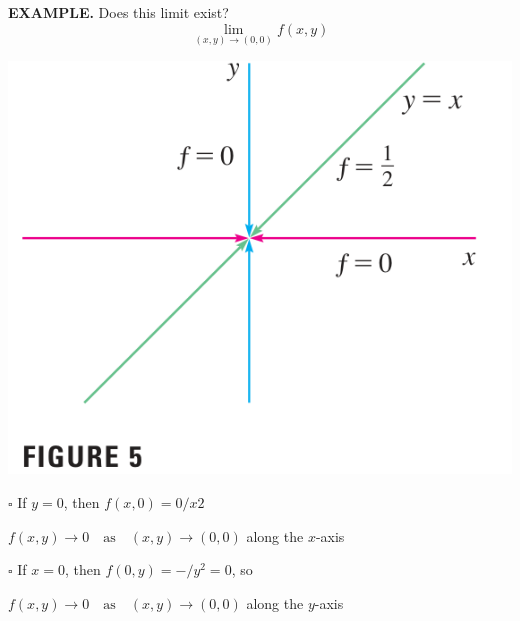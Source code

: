 \documentclass{article}
\begin{document}
  {\selectfont \textbf{\textcolor{blue5}{EXAMPLE.}}} Does this limit exist?
  \[\lim_{(x,y) \to (0,0)} f(x,y)\]

    \begin{minipage}[]{0.35\linewidth}
      \begin{center}
        \includegraphics[width = 5 cm]{./images/lim3g2.png} 
      \end{center}
    \end{minipage}
  \begin{minipage}[]{0.6\linewidth}
    $\square$ If $y = 0$, then $f(x,0) = 0/ x2 $
    \begin{center}
      $f(x,y) \to 0 \quad \text{as} \quad (x,y) \to (0,0)$ along the $x$-axis
    \end{center}
    $\square$ If $x = 0$, then $f(0,y) = -/ y^2 = 0$, so 
    \begin{center}
      $f(x,y) \to 0 \quad \text{as} \quad (x,y) \to (0,0)$ along the $y$-axis
    \end{center}
  \end{minipage}
  
    
\end{document}
